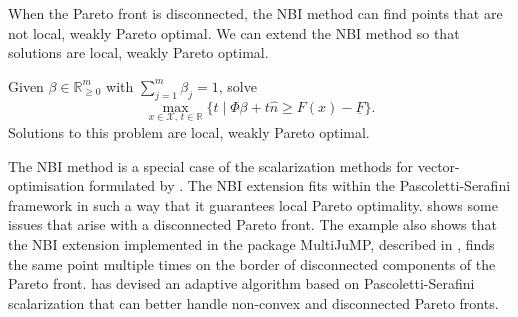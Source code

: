 \documentclass[main.tex]{subfiles}
\begin{document}
When the Pareto front is disconnected, the NBI method can find
points that are not local, weakly Pareto optimal.
We can extend the NBI method so that solutions are local, weakly
Pareto optimal.
\begin{mydef}
  Given $\beta\in\mathbb{R}_{\geq 0}^m$ with $\sum_{j=1}^m\beta_j=1$,
  solve
  \begin{equation}
    \max_{x\in\mathcal{X},\,t\in\mathbb{R}} \{t \mid \Phi\beta +
    t\hat{n} \geq F(x) - \underline{F}\}.
  \end{equation}
  Solutions to this problem are local, weakly Pareto optimal.
\end{mydef}

The NBI method is a special case of the scalarization methods for
vector-optimisation formulated by
\citet{pascoletti1984scalarizing}. The NBI extension fits within the
Pascoletti-Serafini framework in such a way that it guarantees local
Pareto optimality.  shows some issues that
arise with a disconnected Pareto front.  The example also shows that
the NBI extension implemented in the package MultiJuMP, described in
, finds the same point multiple times on the
border of disconnected components of the Pareto front.
\citet{eichfelder2009adaptive} has devised an adaptive algorithm based
on Pascoletti-Serafini scalarization that can better handle non-convex
and disconnected Pareto fronts.
\end{document}

